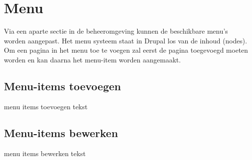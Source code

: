 \section{Menu}\label{menu}
Via een aparte sectie in de beheeromgeving kunnen de beschikbare menu's worden aangepast. Het menu systeem staat in Drupal los van de inhoud (nodes). Om een pagina in het menu toe te voegen zal eerst de pagina toegevoegd moeten worden en kan daarna het menu-item worden aangemaakt.

\subsection{Menu-items toevoegen}\label{menuitemstoevoegen}
menu items toevoegen tekst

\subsection{Menu-items bewerken}\label{menuitemsbewerken}
menu items bewerken tekst